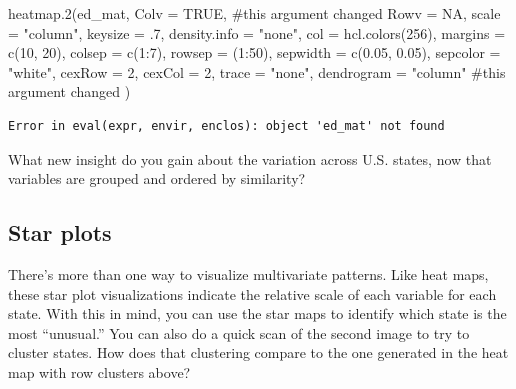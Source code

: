 \documentclass[
  letterpaper,
  DIV=11,
  numbers=noendperiod]{scrreprt}
\newenvironment{Shaded}{\begin{snugshade}}{\end{snugshade}}
\newcommand{\AttributeTok}[1]{\textcolor[rgb]{0.40,0.45,0.13}{#1}}
\newcommand{\CommentTok}[1]{\textcolor[rgb]{0.37,0.37,0.37}{#1}}
\newcommand{\ConstantTok}[1]{\textcolor[rgb]{0.56,0.35,0.01}{#1}}
\newcommand{\DecValTok}[1]{\textcolor[rgb]{0.68,0.00,0.00}{#1}}
\newcommand{\FloatTok}[1]{\textcolor[rgb]{0.68,0.00,0.00}{#1}}
\newcommand{\FunctionTok}[1]{\textcolor[rgb]{0.28,0.35,0.67}{#1}}
\newcommand{\NormalTok}[1]{\textcolor[rgb]{0.00,0.23,0.31}{#1}}
\newcommand{\SpecialCharTok}[1]{\textcolor[rgb]{0.37,0.37,0.37}{#1}}
\newcommand{\StringTok}[1]{\textcolor[rgb]{0.13,0.47,0.30}{#1}}
\begin{document}
\begin{Shaded}
\begin{Highlighting}[]
\FunctionTok{heatmap.2}\NormalTok{(ed\_mat,}
  \AttributeTok{Colv =} \ConstantTok{TRUE}\NormalTok{, }\CommentTok{\#this argument changed}
  \AttributeTok{Rowv =} \ConstantTok{NA}\NormalTok{, }\AttributeTok{scale =} \StringTok{"column"}\NormalTok{, }\AttributeTok{keysize =}\NormalTok{ .}\DecValTok{7}\NormalTok{,}
  \AttributeTok{density.info =} \StringTok{"none"}\NormalTok{, }\AttributeTok{col =} \FunctionTok{hcl.colors}\NormalTok{(}\DecValTok{256}\NormalTok{),}
  \AttributeTok{margins =} \FunctionTok{c}\NormalTok{(}\DecValTok{10}\NormalTok{, }\DecValTok{20}\NormalTok{),}
  \AttributeTok{colsep =} \FunctionTok{c}\NormalTok{(}\DecValTok{1}\SpecialCharTok{:}\DecValTok{7}\NormalTok{), }\AttributeTok{rowsep =}\NormalTok{ (}\DecValTok{1}\SpecialCharTok{:}\DecValTok{50}\NormalTok{), }\AttributeTok{sepwidth =} \FunctionTok{c}\NormalTok{(}\FloatTok{0.05}\NormalTok{, }\FloatTok{0.05}\NormalTok{),}
  \AttributeTok{sepcolor =} \StringTok{"white"}\NormalTok{, }\AttributeTok{cexRow =} \DecValTok{2}\NormalTok{, }\AttributeTok{cexCol =} \DecValTok{2}\NormalTok{, }\AttributeTok{trace =} \StringTok{"none"}\NormalTok{,}
  \AttributeTok{dendrogram =} \StringTok{"column"} \CommentTok{\#this argument changed}
\NormalTok{)}
\end{Highlighting}
\end{Shaded}

\begin{verbatim}
Error in eval(expr, envir, enclos): object 'ed_mat' not found
\end{verbatim}

\begin{Shaded}
\begin{Highlighting}[]
\NormalTok{What new insight do you gain about the variation across U.S. states, now that variables are grouped and ordered by similarity?}
\end{Highlighting}
\end{Shaded}

\subsection*{Star plots}\label{star-plots}

There's more than one way to visualize multivariate patterns. Like heat
maps, these star plot visualizations indicate the relative scale of each
variable for each state. With this in mind, you can use the star maps to
identify which state is the most ``unusual.'' You can also do a quick
scan of the second image to try to cluster states. How does that
clustering compare to the one generated in the heat map with row
clusters above?
\end{document}
